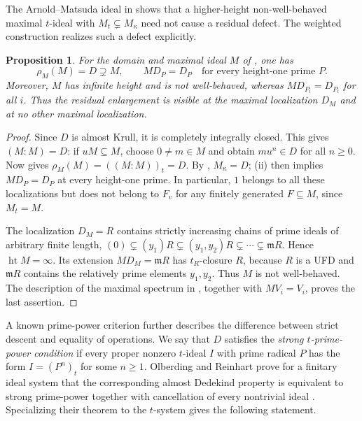 \documentclass[11pt]{amsart}
\newtheorem{proposition}[proposition]{Proposition}
\theoremstyle{definition}
\theoremstyle{remark}
\newcommand{\m}{\mathfrak m}
\begin{document}
The Arnold--Matsuda ideal in  shows that a
higher-height non-well-behaved maximal $t$-ideal with
$M_t\subsetneq M_\kappa$ need not cause a residual defect.  The weighted
construction realizes such a defect explicitly.

\begin{proposition}\label{prop:explicit-residual}
For the domain and maximal ideal $M$ of , one has
\begin{equation}\label{eq:explicit-residual}
 \rho_M(M)=D\supsetneq M,\qquad
 MD_P=D_P\quad\text{for every height-one prime }P.
\end{equation}
Moreover, $M$ has infinite height and is not well-behaved, whereas
$MD_{P_i}=D_{P_i}$ for all $i$.  Thus the residual enlargement is visible
at the maximal localization $D_M$ and at no other maximal localization.
\end{proposition}

\begin{proof}
Since $D$ is almost Krull, it is completely integrally closed.  This gives
$(M:M)=D$: if $uM\subseteq M$, choose $0\ne m\in M$ and obtain
$mu^n\in D$ for all $n\geq0$.  Now  gives
$\rho_M(M)=((M:M))_t=D$.  By , $M_\kappa=D$;
(ii) then implies $MD_P=D_P$ at every height-one
prime.  In particular, $1$ belongs to all these localizations but does not
belong to $F_v$ for any finitely generated $F\subseteq M$, since $M_t=M$.

The localization $D_M=R$ contains strictly increasing chains of prime
ideals of arbitrary finite length,
$(0)\subsetneq(y_1)R\subsetneq(y_1,y_2)R\subsetneq\cdots\subsetneq\m R$.
Hence $\operatorname{ht}M=\infty$.  Its extension $MD_M=\m R$ has
$t_R$-closure $R$, because $R$ is a UFD and $\m R$ contains the relatively
prime elements $y_1,y_2$.  Thus $M$ is not well-behaved.  The description
of the maximal spectrum in , together with
$MV_i=V_i$, proves the last assertion.
\end{proof}

A known prime-power criterion further describes the difference between
strict descent and equality of operations.  We say that $D$ satisfies the
\emph{strong $t$-prime-power condition} if every proper nonzero $t$-ideal
$I$ with prime radical $P$ has the form $I=(P^n)_t$ for some $n\geq1$.
Olberding and Reinhart prove for a finitary ideal system that the corresponding
almost Dedekind property is equivalent to strong prime-power together with
cancellation of every nontrivial ideal
\cite[Proposition~3.6]{OlberdingReinhart}.  Specializing their theorem to the
$t$-system gives the following statement.
\end{document}
